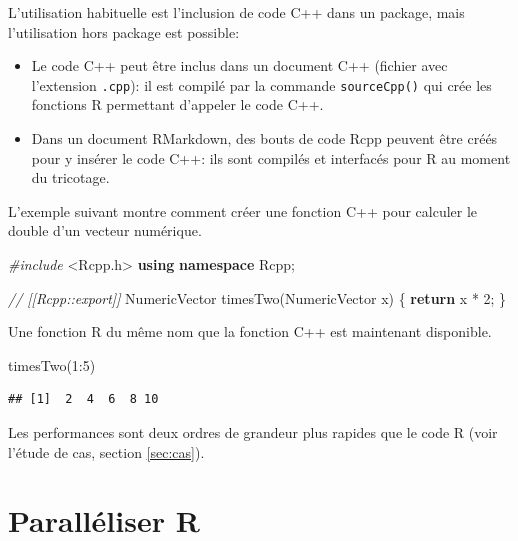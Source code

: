 \documentclass[
  11pt,
  french,
  a4paper,
  extrafontsizes,onecolumn,openright
  ]{memoir}
\newenvironment{Shaded}{\begin{snugshade}}{\end{snugshade}}
\newcommand{\CommentTok}[1]{\textcolor[rgb]{0.56,0.35,0.01}{\textit{#1}}}
\newcommand{\ControlFlowTok}[1]{\textcolor[rgb]{0.13,0.29,0.53}{\textbf{#1}}}
\newcommand{\DecValTok}[1]{\textcolor[rgb]{0.00,0.00,0.81}{#1}}
\newcommand{\FunctionTok}[1]{\textcolor[rgb]{0.00,0.00,0.00}{#1}}
\newcommand{\ImportTok}[1]{#1}
\newcommand{\KeywordTok}[1]{\textcolor[rgb]{0.13,0.29,0.53}{\textbf{#1}}}
\newcommand{\NormalTok}[1]{#1}
\newcommand{\PreprocessorTok}[1]{\textcolor[rgb]{0.56,0.35,0.01}{\textit{#1}}}
\newcommand{\SpecialCharTok}[1]{\textcolor[rgb]{0.00,0.00,0.00}{#1}}
\providecommand{\tightlist}{%
  \setlength{\itemsep}{0pt}\setlength{\parskip}{0pt}}
\begin{document}
L'utilisation habituelle est l'inclusion de code C++ dans un package, mais l'utilisation hors package est possible:

\begin{itemize}
\tightlist
\item
  Le code C++ peut être inclus dans un document C++ (fichier avec l'extension \texttt{.cpp}): il est compilé par la commande \texttt{sourceCpp()} qui crée les fonctions R permettant d'appeler le code C++.
\item
  Dans un document RMarkdown, des bouts de code Rcpp peuvent être créés pour y insérer le code C++: ils sont compilés et interfacés pour R au moment du tricotage.
\end{itemize}

L'exemple suivant montre comment créer une fonction C++ pour calculer le double d'un vecteur numérique.

\scriptsize

\begin{Shaded}
\begin{Highlighting}[]
\PreprocessorTok{\#include }\ImportTok{\textless{}Rcpp.h\textgreater{}}
\KeywordTok{using} \KeywordTok{namespace}\NormalTok{ Rcpp;}

\CommentTok{// [[Rcpp::export]]}
\NormalTok{NumericVector timesTwo(NumericVector x) \{}
  \ControlFlowTok{return}\NormalTok{ x * }\DecValTok{2}\NormalTok{;}
\NormalTok{\}}
\end{Highlighting}
\end{Shaded}

\normalsize

Une fonction R du même nom que la fonction C++ est maintenant disponible.

\scriptsize

\begin{Shaded}
\begin{Highlighting}[]
\FunctionTok{timesTwo}\NormalTok{(}\DecValTok{1}\SpecialCharTok{:}\DecValTok{5}\NormalTok{)}
\end{Highlighting}
\end{Shaded}

\begin{verbatim}
## [1]  2  4  6  8 10
\end{verbatim}

\normalsize

Les performances sont deux ordres de grandeur plus rapides que le code R (voir l'étude de cas, section \ref{sec:cas}).

\hypertarget{paralluxe9liser-r}{%
\section{Paralléliser R}\label{paralluxe9liser-r}}
\end{document}
